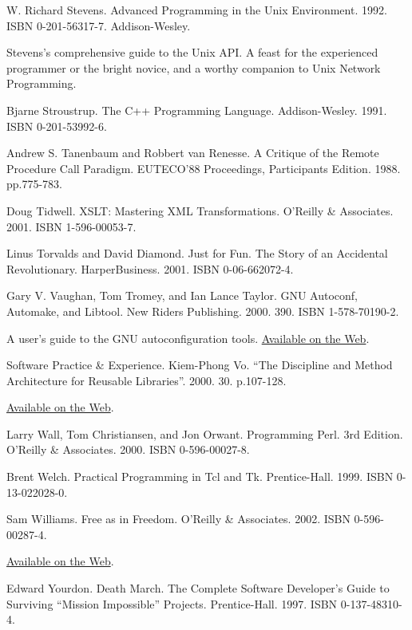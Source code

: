 \documentclass[12pt,oneside]{book}
\begin{document}
\begin{common-format}
\begin{thebibliography}{9}
 W. Richard Stevens. Advanced Programming in the Unix Environment. 1992. ISBN 0-201-56317-7. Addison-Wesley.

Stevens's comprehensive guide to the Unix API. A feast for the experienced programmer or the bright novice, and a worthy companion to Unix Network Programming.

 Bjarne Stroustrup. The C++ Programming Language. Addison-Wesley. 1991. ISBN 0-201-53992-6.

 Andrew S. Tanenbaum and Robbert van Renesse. A Critique of the Remote Procedure Call Paradigm. EUTECO'88 Proceedings, Participants Edition. 1988. pp.775-783.

 Doug Tidwell. XSLT: Mastering XML Transformations. O'Reilly \&{}  Associates. 2001. ISBN 1-596-00053-7.

 Linus Torvalds and David Diamond. Just for Fun. The Story of an Accidental Revolutionary. HarperBusiness. 2001. ISBN 0-06-662072-4.

 Gary V. Vaughan, Tom Tromey, and Ian Lance Taylor. GNU Autoconf, Automake, and Libtool. New Riders Publishing. 2000. 390. ISBN 1-578-70190-2.

A user's guide to the GNU autoconfiguration tools. \href{http://sources.redhat.com/autobook/}{Available on the Web}.

 Software Practice \&{} Experience. Kiem-Phong Vo. “The Discipline and Method Architecture for Reusable Libraries”. 2000. 30. p.107-128.

\href{http://www.research.att.com/sw/tools/vcodex/dm-spe.ps}{Available on the Web}.

\bibitem[Wall2000] Larry Wall, Tom Christiansen, and Jon Orwant. Programming Perl. 3rd Edition. O'Reilly \&{} Associates. 2000. ISBN 0-596-00027-8.

 Brent Welch. Practical Programming in Tcl and Tk. Prentice-Hall. 1999. ISBN 0-13-022028-0.

 Sam Williams. Free as in Freedom. O'Reilly \&{} Associates. 2002. ISBN 0-596-00287-4.

\href{http://www.oreilly.com/openbook/freedom/index.html}{Available on the Web}.

 Edward Yourdon. Death March. The Complete Software Developer's Guide to Surviving “Mission Impossible” Projects. Prentice-Hall. 1997. ISBN 0-137-48310-4. 
\end{thebibliography}


\end{common-format}  
\end{document}
